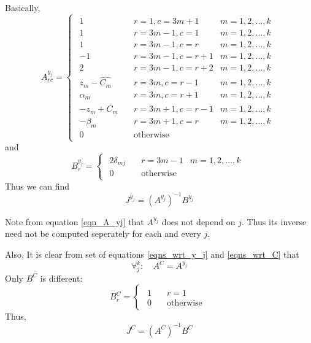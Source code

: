 \documentclass[11 pt]{article}
\begin{document}
Basically,
\begin{equation} \label{eqn_A_yj}
    A_{rc}^{y_j} = \begin{cases}
        \begin{aligned}
            1 &\quad    r=1,c=3m+1 & m=1,2,...,k \\
            1 &\quad    r=3m-1,c=1 & m=1,2,...,k \\
            1 &\quad    r=3m-1,c=r & m=1,2,...,k \\
            -1 &\quad   r=3m-1,c=r+1 & m=1,2,...,k \\
            2 &\quad    r=3m-1,c=r+2 & m=1,2,...,k \\
            z_m-\hat{C_m} &\quad    r=3m,c=r-1 & m=1,2,...,k \\
            \alpha_m &\quad r=3m,c=r+1 & m=1,2,...,k \\
            -z_m+\check{C_m} &\quad  r=3m+1,c=r-1 & m=1,2,...,k \\
            -\beta_m &\quad r=3m+1,c=r & m=1,2,...,k \\
            0 &\quad \text{otherwise}
        \end{aligned}
    \end{cases}
\end{equation}
and
\begin{equation} \label{eqn_B_yj}
    B_r^{y_j} = \begin{cases}
        \begin{aligned}
            2 \delta_{mj} &\quad r=3m-1 & m=1,2,...,k \\
            0 &\quad \text{otherwise}
        \end{aligned}
    \end{cases}
\end{equation}
Thus we can find
\begin{equation}
    J^{y_j} = (A^{y_j})^{-1} B^{y_j}
\end{equation}

Note from equation \ref{eqn_A_yj} that $A^{y_j}$ does not depend on $j$. Thus its inverse need not be computed seperately for each and every $j$.

Also, It is clear from set of equations \ref{eqns_wrt_y_j} and \ref{eqns_wrt_C} that
\begin{equation}\label{eqn_all_A_same}
    \forall_j^k:\quad A^C = A^{y_j}
\end{equation}
Only $B^C$ is different:
\begin{equation}
    B_r^C = \begin{cases}
        \begin{aligned}
            1 &\quad r=1 \\
            0 &\quad \text{otherwise}
        \end{aligned}
    \end{cases}
\end{equation}
Thus,
\begin{equation}
    J^{C} = (A^C)^{-1} B^{C}
\end{equation}
\end{document}
